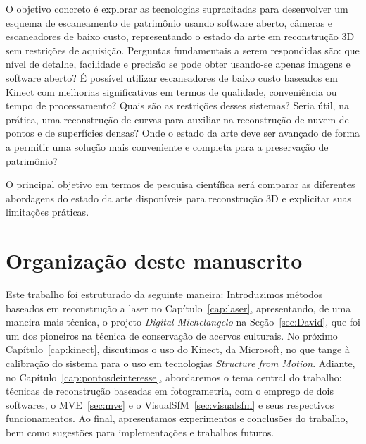 O objetivo concreto é explorar as tecnologias supracitadas para
desenvolver um esquema de escaneamento de patrimônio usando software aberto, câmeras e
escaneadores de baixo custo, representando o estado da arte em reconstrução 3D sem
restrições de aquisição. Perguntas fundamentais a serem respondidas são: que
nível de detalhe, facilidade e precisão se pode obter usando-se apenas imagens e software
aberto? É possível utilizar escaneadores de baixo custo baseados em Kinect com
melhorias significativas em termos de qualidade, conveniência ou tempo de
processamento?  Quais são as restrições desses sistemas? Seria útil, na prática,
uma reconstrução de curvas para auxiliar na reconstrução de nuvem de pontos e de
superfícies densas? Onde o estado da arte deve ser avançado de forma a permitir
uma solução mais conveniente e completa para a preservação de patrimônio?

O principal objetivo em termos de pesquisa científica será comparar as
diferentes abordagens do estado da arte disponíveis para reconstrução 3D e
explicitar suas limitações práticas.

\section*{Organização deste manuscrito}

Este trabalho foi estruturado da seguinte maneira: Introduzimos
métodos baseados em reconstrução a laser no Capítulo~\ref{cap:laser},
apresentando, de uma maneira mais técnica, o projeto \emph{Digital
Michelangelo} na Seção~\ref{sec:David}, que foi um dos pioneiros na técnica de
conservação de acervos culturais. No próximo Capítulo~\ref{cap:kinect},
discutimos o uso do Kinect, da Microsoft, no que tange à calibração do sistema
para o uso em tecnologias \emph{Structure from Motion}.  Adiante, no
Capítulo~\ref{cap:pontosdeinteresse}, abordaremos o tema central do trabalho:
técnicas de reconstrução baseadas em fotogrametria, com o emprego de dois
softwares, o MVE~\ref{sec:mve} e o VisualSfM~\ref{sec:visualsfm} e seus
respectivos funcionamentos. Ao final, apresentamos experimentos e conclusões
do trabalho, bem como sugestões para implementações e trabalhos futuros.


